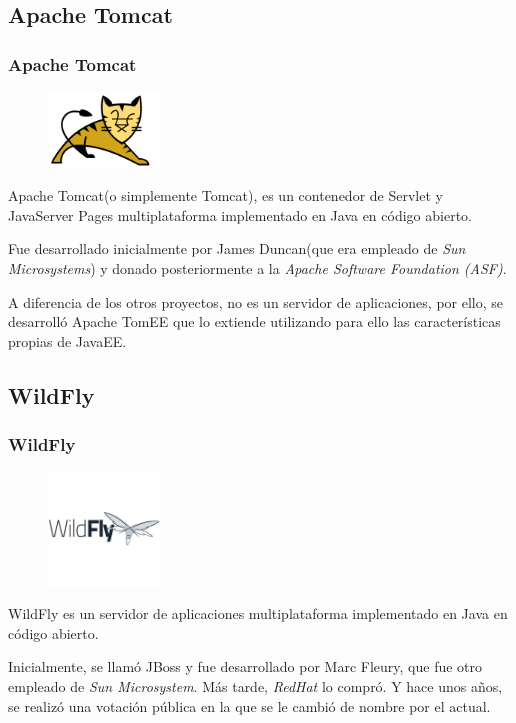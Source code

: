 \documentclass[12pt, aspectratio=169]{beamer} %
\begin{document}
	\subsection{Apache Tomcat}
		\begin{frame}
			\frametitle{Apache Tomcat}
			
			\begin{figure}
				\includegraphics[width=3cm]{Tomcat_logo.jpg}
			\end{figure} 
			
			\pause
			
			Apache Tomcat(o simplemente Tomcat), es un contenedor de Servlet y JavaServer
			Pages multiplataforma implementado en Java en código abierto.
			
			Fue desarrollado inicialmente por James Duncan(que era empleado de \textit{Sun
			Microsystems}) y donado posteriormente a la \textit{Apache Software Foundation (ASF)}.
			
			A diferencia de los otros proyectos, no es un servidor de aplicaciones, por ello,
			se desarrolló Apache TomEE que lo extiende utilizando para ello las características
			propias de JavaEE.
		\end{frame}

	\subsection{WildFly}
		\begin{frame}
			\frametitle{WildFly}
			
			\begin{figure}
				\includegraphics[width=3cm]{WildFly_logo.jpg}
			\end{figure}
			
			\pause
			
			WildFly es un servidor de aplicaciones multiplataforma implementado en Java en
			código abierto.
			
			Inicialmente, se llamó JBoss y fue desarrollado por Marc Fleury, que fue otro
			empleado de \textit{Sun Microsystem}. Más tarde, \textit{RedHat} lo compró. Y hace
			unos años, se realizó una votación pública en la que se le cambió de nombre por el
			actual.
			
		\end{frame}
	
\end{document}
